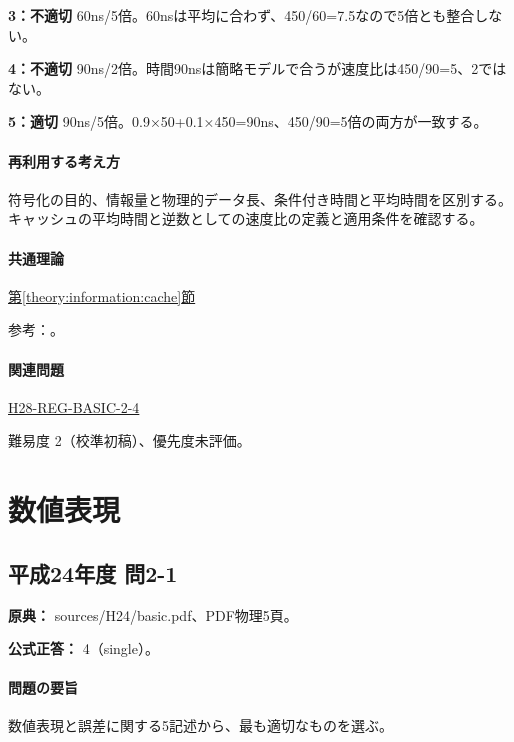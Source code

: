 \noindent\textbf{3：不適切} 60ns/5倍。60nsは平均に合わず、450/60=\allowbreak{}7.5なので5倍とも整合しない。\par

\noindent\textbf{4：不適切} 90ns/2倍。時間90nsは簡略モデルで合うが速度比は450/90=\allowbreak{}5、2ではない。\par

\noindent\textbf{5：適切} 90ns/5倍。0.9×50+0.1×450=\allowbreak{}90ns、450/90=\allowbreak{}5倍の両方が一致する。\par

\paragraph{再利用する考え方} 符号化の目的、情報量と物理的データ長、条件付き時間と平均時間を区別する。キャッシュの平均時間と逆数としての速度比の定義と適用条件を確認する。

\paragraph{共通理論} \hyperref[theory:information:cache]{第\ref*{theory:information:cache}節}

\par 参考：\cite{info_cache}。

\paragraph{関連問題} \hyperref[q:h28-reg-basic-2-4]{H28-REG-BASIC-2-4}

\par 難易度 2（校準初稿）、優先度未評価。

\section{数値表現}

\subsection{平成24年度 問2-1}
\label{q:h24-reg-basic-2-1}

\noindent\textbf{原典：} sources/H24/basic.pdf、PDF物理5頁。

\textbf{公式正答：} 4（single）。

\paragraph{問題の要旨} 数値表現と誤差に関する5記述から、最も適切なものを選ぶ。


